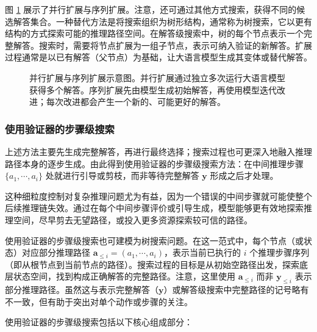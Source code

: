 图 \ref{fig:parallel-and-sequential-scaling} 展示了并行扩展与序列扩展。注意，还可通过其他方式搜索，获得不同的候选解答集合。一种替代方法是将搜索组织为树形结构，通常称为树搜索，它以更有结构的方式探索可能的推理路径空间。在解答级搜索中，树的每个节点表示一个完整解答。搜索时，需要将节点扩展为一组子节点，表示可纳入验证的新解答。扩展过程通常是以已有解答（父节点）为基础，让大语言模型生成其变体或替代解答。

\begin{figure}[!t]
\centering

\vspace{-0.5cm} \caption{并行扩展与序列扩展示意图。并行扩展通过独立多次运行大语言模型获得多个解答。序列扩展先由模型生成初始解答，再使用模型迭代改进；每次改进都会产生一个新的、可能更好的解答。}
\label{fig:parallel-and-sequential-scaling}
\end{figure}

\subsubsection{使用验证器的步骤级搜索}

上述方法主要先生成完整解答，再进行最终选择；搜索过程也可更深入地融入推理路径本身的逐步生成。由此得到使用验证器的步骤级搜索方法：在中间推理步骤 $\{a_1,\cdots,a_{i}\}$ 处就进行引导或剪枝，而非等待完整解答 $\mathbf{y}$ 形成之后才处理。

这种细粒度控制对复杂推理问题尤为有益，因为一个错误的中间步骤就可能使整个后续推理链失效。通过在每个中间步骤评价或引导生成，模型能够更有效地探索推理空间，尽早剪去无望路径，或投入更多资源探索较可信的路径。

使用验证器的步骤级搜索也可建模为树搜索问题。在这一范式中，每个节点（或状态）对应部分推理路径 $\mathbf{a}_{\le i} = (a_1,\cdots,a_i)$，表示当前已执行的 $i$ 个推理步骤序列（即从根节点到当前节点的路径）。搜索过程的目标是从初始空路径出发，探索底层状态空间，找到构成正确解答的完整路径。注意，这里使用 $\mathbf{a}_{\le i}$ 而非 $\mathbf{y}_{\le i}$ 表示部分推理路径。虽然这与表示完整解答（$\mathbf{y}$）或解答级搜索中完整路径的记号略有不一致，但有助于突出对单个动作或步骤的关注。

使用验证器的步骤级搜索包括以下核心组成部分：

